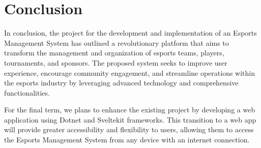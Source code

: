 \chapter{Conclusion}
\hrulefill

In conclusion, the project for the development and implementation of an Esports Management System has outlined a revolutionary platform that aims to transform the management and organization of esports teams, players, tournaments, and sponsors. The proposed system seeks to improve user experience, encourage community engagement, and streamline operations within the esports industry by leveraging advanced technology and comprehensive functionalities.

For the final term, we plans to enhance the existing project by developing a web application using Dotnet and Sveltekit frameworks. This transition to a web app will provide greater accessibility and flexibility to users, allowing them to access the Esports Management System from any device with an internet connection.